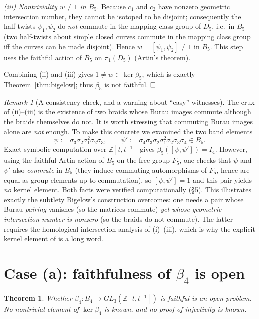 \documentclass{amsart}
\newtheorem{theorem}{Theorem}
\theoremstyle{remark}
\newtheorem{remark}{Remark}
\begin{document}
\emph{(iii) Nontriviality $w\ne1$ in $B_5$.}
Because $c_1$ and $c_2$ have nonzero geometric intersection number, they cannot
be isotoped to be disjoint; consequently the half-twists $\psi_1,\psi_2$ do
\emph{not} commute in the mapping class group of $D_5$, i.e.\ in $B_5$ (two
half-twists about simple closed curves commute in the mapping class group iff
the curves can be made disjoint). Hence $w=[\psi_1,\psi_2]\ne1$ in $B_5$. This
step uses the faithful action of $B_5$ on $\pi_1(D_5)$ (Artin's theorem).

Combining (ii) and (iii) gives $1\ne w\in\ker\beta_5$, which is exactly
Theorem~\ref{thm:bigelow}; thus $\beta_5$ is not faithful. $\hfill\square$

\begin{remark}[A consistency check, and a warning about ``easy'' witnesses]
The crux of (ii)--(iii) is the existence of two braids whose Burau images
commute although the braids themselves do not. It is worth stressing that
commuting Burau images alone are \emph{not} enough. To make this concrete we
examined the two band elements
\[
\psi:=\sigma_3\sigma_2\sigma_1^{2}\sigma_2\sigma_3,\qquad
\psi':=\sigma_4\sigma_3\sigma_2\sigma_1^{2}\sigma_2\sigma_3\sigma_4 \in B_5 .
\]
Exact symbolic computation over $\mathbb Z[t,t^{-1}]$ gives
$\beta_5([\psi,\psi'])=I_4$. However, using the faithful Artin action of $B_5$
on the free group $F_5$, one checks that $\psi$ and $\psi'$ also \emph{commute}
in $B_5$ (they induce commuting automorphisms of $F_5$, hence are equal as
group elements up to commutation), so $[\psi,\psi']=1$ and this pair yields
\emph{no} kernel element. Both facts were verified computationally (\S5). This
illustrates exactly the subtlety Bigelow's construction overcomes: one needs a
pair whose Burau \emph{pairing} vanishes (so the matrices commute) \emph{yet
whose geometric intersection number is nonzero} (so the braids do not commute).
The latter requires the homological intersection analysis of (i)--(iii), which
is why the explicit kernel element of \cite{Bigelow1999} is a long word.
\end{remark}

\section{Case (a): faithfulness of $\beta_4$ is open}

\begin{theorem}\label{thm:open}
Whether $\beta_4:B_4\to GL_3(\mathbb Z[t,t^{-1}])$ is faithful is an open
problem. No nontrivial element of $\ker\beta_4$ is known, and no proof of
injectivity is known.
\end{theorem}
\end{document}

